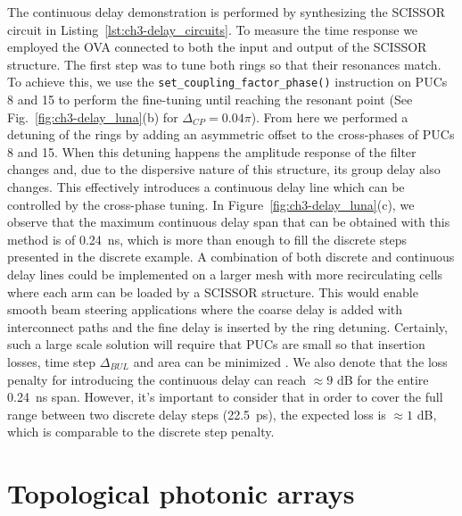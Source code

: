 The continuous delay demonstration is performed by synthesizing the SCISSOR circuit in Listing~\ref{lst:ch3-delay_circuits}.
To measure the time response we employed the OVA connected to both the input and output of the SCISSOR structure.
The first step was to tune both rings so that their resonances match.
To achieve this, we use the \lstinline|set_coupling_factor_phase()| instruction on PUCs 8 and 15 to perform the fine-tuning until reaching the resonant point (See Fig.~\ref{fig:ch3-delay_luna}(b) for \(\Delta_{CP}=0.04 \pi \)).
From here we performed a detuning of the rings by adding an asymmetric offset to the cross-phases of PUCs 8 and 15.
When this detuning happens the amplitude response of the filter changes and, due to the dispersive nature of this structure, its group delay also changes.
This effectively introduces a continuous delay line which can be controlled by the cross-phase tuning.
In Figure~\ref{fig:ch3-delay_luna}(c), we observe that the maximum continuous delay span that can be obtained with this method is of 0.24~ns, which is more than enough to fill the discrete steps presented in the discrete example.
A combination of both discrete and continuous delay lines could be implemented on a larger mesh with more recirculating cells where each arm can be loaded by a SCISSOR structure.
This would enable smooth beam steering applications where the coarse delay is added with interconnect paths and the fine delay is inserted by the ring detuning.
Certainly, such a large scale solution will require that PUCs are small so that insertion losses, time step \(\Delta_{BUL}\) and area can be minimized \cite{perez-lopez_integrated_2019}.
We also denote that the loss penalty for introducing the continuous delay can reach \(\approx 9\) dB for the entire 0.24~ns span.
However, it's important to consider that in order to cover the full range between two discrete delay steps (22.5~ps), the expected loss is \(\approx 1\) dB, which is comparable to the discrete step penalty.


\section{Topological photonic arrays}\label{sec:topological_photonic_arrays} %


